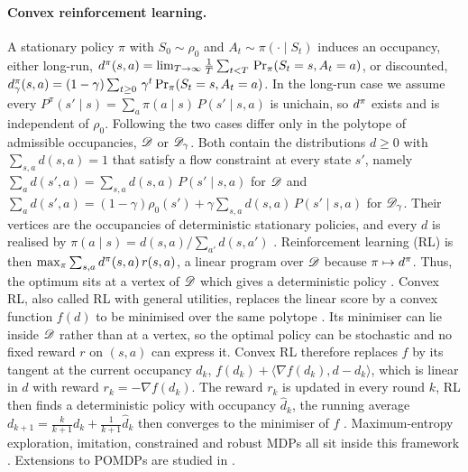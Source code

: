 \paragraph{Convex reinforcement learning.}
A stationary policy $\pi$ with $S_0 \sim \rho_0$ and $A_t \sim \pi(\cdot \mid S_t)$ induces an occupancy, either long-run, $d^{\pi}(s,a) = \lim_{T\to\infty} \frac1T \sum_{t<T}\, \Pr_\pi(S_t = s, A_t = a)$, or discounted, $d^{\pi}_\gamma(s,a) = (1-\gamma) \sum_{t \ge 0}\, \gamma^t \Pr_\pi(S_t = s, A_t = a)$.
In the long-run case we assume every $P^\pi(s' \mid s) = \sum_a \pi(a \mid s)\, P(s' \mid s,a)$ is unichain, so $d^{\pi}$ exists and is independent of $\rho_0$.
Following \citet{Zahavy-reward21} the two cases differ only in the polytope of admissible occupancies, $\mathscr D$ or $\mathscr D_\gamma$.
Both contain the distributions $d \ge 0$ with $\sum_{s,a} d(s,a) = 1$ that satisfy a flow constraint at every state $s'$, namely $\sum_a d(s',a) = \sum_{s,a} d(s,a)\, P(s' \mid s,a)$ for $\mathscr D$ and $\sum_a d(s',a) = (1-\gamma)\rho_0(s') + \gamma \sum_{s,a} d(s,a)\, P(s' \mid s,a)$ for $\mathscr D_\gamma$.
Their vertices are the occupancies of deterministic stationary policies, and every $d$ is realised by $\pi(a \mid s) = d(s,a) / \sum_{a'} d(s,a')$ \citep{Puterman-markov94}.
Reinforcement learning (RL) is then $\max_\pi \sum_{s,a} d^{\pi}(s,a)\, r(s,a)$, a linear program over $\mathscr D$ because $\pi \mapsto d^{\pi}$.
Thus, the optimum sits at a vertex of $\mathscr D$ which gives a deterministic policy \citep{Puterman-markov94}.
Convex RL, also called RL with general utilities, replaces the linear score by a convex function $f(d)$ to be minimised over the same polytope \citep{Zhang-variational20,Hazan-provably19,Zahavy-reward21,Mutti-convex23}.
Its minimiser can lie inside $\mathscr D$ rather than at a vertex, so the optimal policy can be stochastic and no fixed reward $r$ on $(s,a)$ can express it.
Convex RL therefore replaces $f$ by its tangent at the current occupancy $d_k$, $f(d_k) + \langle \nabla f(d_k), d - d_k \rangle$, which is linear in $d$ with reward $r_k = -\nabla f(d_k)$.
The reward $r_k$ is updated in every round $k$, RL then finds a deterministic policy with occupancy $\hat d_k$, the running average $d_{k+1} = \tfrac{k}{k+1} d_k + \tfrac{1}{k+1} \hat d_k$ then converges to the minimiser of $f$ \citep{Hazan-provably19,Zahavy-reward21}.
Maximum-entropy exploration, imitation, constrained and robust MDPs all sit inside this framework \citep{Hazan-provably19,Zahavy-reward21}.
Extensions to POMDPs are studied in \citep{Zamboni-how24,Zamboni-limits24}.



